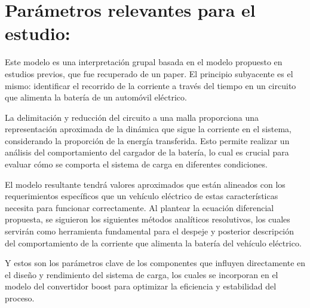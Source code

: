 \section*{Parámetros relevantes para el estudio:}
Este modelo es una interpretación grupal basada en el modelo propuesto en estudios previos,
que fue recuperado de un paper. El principio subyacente es el mismo: identificar el recorrido
de la corriente a través del tiempo en un circuito que alimenta la batería de un automóvil
eléctrico.

La delimitación y reducción del circuito a una malla proporciona una representación
aproximada de la dinámica que sigue la corriente en el sistema, considerando la proporción de
la energía transferida. Esto permite realizar un análisis del comportamiento del cargador de la
batería, lo cual es crucial para evaluar cómo se comporta el sistema de carga en diferentes
condiciones.

El modelo resultante tendrá valores aproximados que están alineados con los requerimientos
específicos que un vehículo eléctrico de estas características necesita para funcionar
correctamente. Al plantear la ecuación diferencial propuesta, se siguieron los siguientes
métodos analíticos resolutivos, los cuales servirán como herramienta fundamental para el
despeje y posterior descripción del comportamiento de la corriente que alimenta la batería del
vehículo eléctrico.

Y estos son los parámetros clave de los componentes que influyen directamente en el diseño y
rendimiento del sistema de carga, los cuales se incorporan en el modelo del convertidor boost
para optimizar la eficiencia y estabilidad del proceso.

